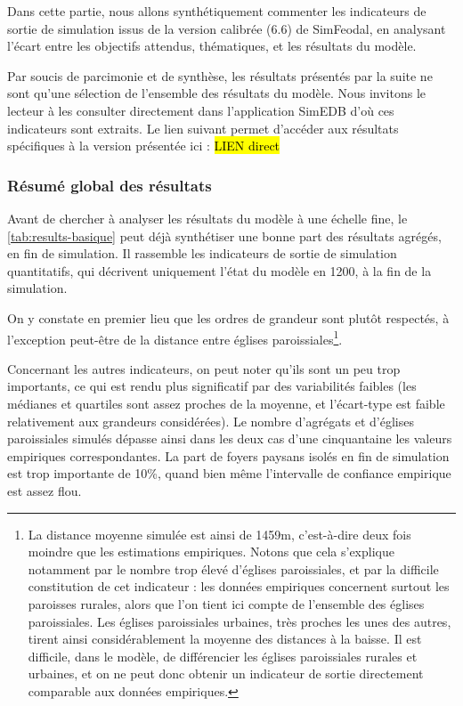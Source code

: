 Dans cette partie, nous allons synthétiquement commenter les indicateurs de sortie de simulation issus de la version calibrée (6.6) de SimFeodal, en analysant l'écart entre les objectifs attendus, thématiques, et les résultats du modèle.

\begin{mdframed}[backgroundcolor=black!5,footnoteinside=false]
Par soucis de parcimonie et de synthèse, les résultats présentés par la suite ne sont qu'une sélection de l'ensemble des résultats du modèle.
Nous invitons le lecteur à les consulter directement dans l'application SimEDB d'où ces indicateurs sont extraits.
Le lien suivant permet d'accéder aux résultats spécifiques à la version présentée ici : \hl{LIEN direct}
\end{mdframed}

\subsubsection{Résumé global des résultats \label{ssec:results-global}}

Avant de chercher à analyser les résultats du modèle à une échelle fine, le \cref{tab:results-basique} peut déjà synthétiser une bonne part des résultats agrégés, en fin de simulation.
Il rassemble les indicateurs de sortie de simulation quantitatifs, qui décrivent uniquement l'état du modèle en 1200, à la fin de la simulation.




On y constate en premier lieu que les ordres de grandeur sont plutôt respectés, à l'exception peut-être de la distance entre églises paroissiales\footnote{
	La distance moyenne simulée	est ainsi de 1459m, c'est-à-dire deux fois moindre que les estimations empiriques.
	Notons que cela s'explique notamment par le nombre trop élevé d'églises paroissiales, et par la difficile constitution de cet indicateur : les données empiriques concernent surtout les paroisses rurales, alors que l'on tient ici compte de l'ensemble des églises paroissiales.
	Les églises paroissiales urbaines, très proches les unes des autres, tirent ainsi considérablement la moyenne des distances à la baisse.
	Il est difficile, dans le modèle, de différencier les églises paroissiales rurales et urbaines, et on ne peut donc obtenir un indicateur de sortie directement comparable aux données empiriques.
}.

Concernant les autres indicateurs, on peut noter qu'ils sont un peu trop importants, ce qui est rendu plus significatif par des variabilités faibles (les médianes et quartiles sont assez proches de la moyenne, et l'écart-type est faible relativement aux grandeurs considérées).
Le nombre d'agrégats et d'églises paroissiales simulés dépasse ainsi dans les deux cas d'une cinquantaine les valeurs empiriques correspondantes.
La part de foyers paysans isolés en fin de simulation est trop importante de 10\%, quand bien même l'intervalle de confiance empirique est assez flou.

